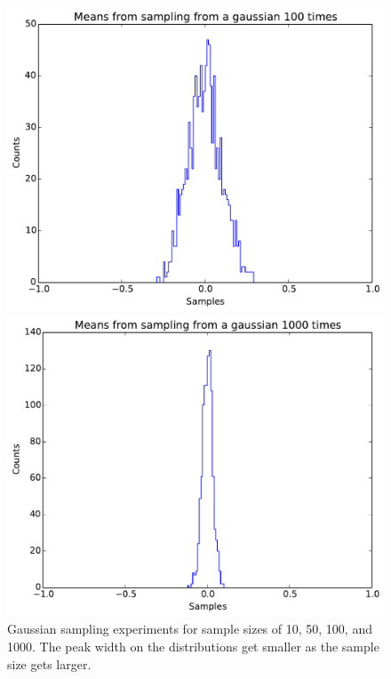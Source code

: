 \documentclass[11pt,letterpaper]{article}
\begin{document}
\begin{figure}
    \begin{minipage}[t]{0.45\textwidth}
        \centering
        \includegraphics[width=\textwidth]{figures/problem3_4.pdf}
    \end{minipage}
    \hspace{0.5cm}
    \begin{minipage}[t]{0.45\textwidth}
        \centering
        \includegraphics[width=\textwidth]{figures/problem3_5.pdf}
    \end{minipage}
    \caption{Gaussian sampling experiments for sample sizes of 10, 50, 100, and
    1000. The peak width on the distributions get smaller as the sample size
    gets larger.}
    \label{sample_gaus}
\end{figure}
\end{document}
